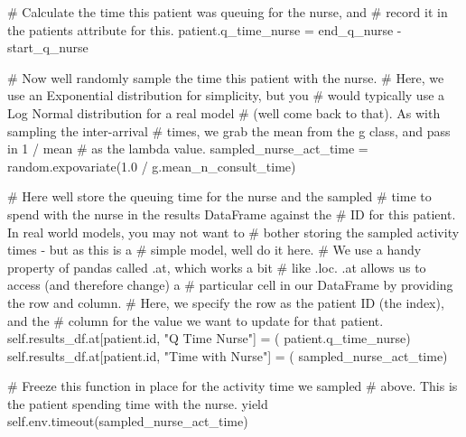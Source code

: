 \documentclass[
  letterpaper,
  DIV=11,
  numbers=noendperiod]{scrreprt}
\newenvironment{Shaded}{}{}
\newcommand{\BuiltInTok}[1]{\textcolor[rgb]{0.84,0.23,0.29}{#1}}
\newcommand{\CommentTok}[1]{\textcolor[rgb]{0.42,0.45,0.49}{#1}}
\newcommand{\ControlFlowTok}[1]{\textcolor[rgb]{0.84,0.23,0.29}{#1}}
\newcommand{\FloatTok}[1]{\textcolor[rgb]{0.00,0.36,0.77}{#1}}
\newcommand{\NormalTok}[1]{\textcolor[rgb]{0.14,0.16,0.18}{#1}}
\newcommand{\OperatorTok}[1]{\textcolor[rgb]{0.14,0.16,0.18}{#1}}
\newcommand{\StringTok}[1]{\textcolor[rgb]{0.01,0.18,0.38}{#1}}
\newcommand{\VariableTok}[1]{\textcolor[rgb]{0.89,0.38,0.04}{#1}}
\begin{document}
\begin{tcolorbox}
\begin{Shaded}
\begin{Highlighting}[]
            \CommentTok{\# Calculate the time this patient was queuing for the nurse, and}
            \CommentTok{\# record it in the patient\textquotesingle{}s attribute for this.}
\NormalTok{            patient.q\_time\_nurse }\OperatorTok{=}\NormalTok{ end\_q\_nurse }\OperatorTok{{-}}\NormalTok{ start\_q\_nurse}

            \CommentTok{\# Now we\textquotesingle{}ll randomly sample the time this patient with the nurse.}
            \CommentTok{\# Here, we use an Exponential distribution for simplicity, but you}
            \CommentTok{\# would typically use a Log Normal distribution for a real model}
            \CommentTok{\# (we\textquotesingle{}ll come back to that).  As with sampling the inter{-}arrival}
            \CommentTok{\# times, we grab the mean from the g class, and pass in 1 / mean}
            \CommentTok{\# as the lambda value.}
\NormalTok{            sampled\_nurse\_act\_time }\OperatorTok{=}\NormalTok{ random.expovariate(}\FloatTok{1.0} \OperatorTok{/}
\NormalTok{                                                        g.mean\_n\_consult\_time)}

            \CommentTok{\# Here we\textquotesingle{}ll store the queuing time for the nurse and the sampled}
            \CommentTok{\# time to spend with the nurse in the results DataFrame against the}
            \CommentTok{\# ID for this patient.  In real world models, you may not want to}
            \CommentTok{\# bother storing the sampled activity times {-} but as this is a}
            \CommentTok{\# simple model, we\textquotesingle{}ll do it here.}
            \CommentTok{\# We use a handy property of pandas called .at, which works a bit}
            \CommentTok{\# like .loc.  .at allows us to access (and therefore change) a}
            \CommentTok{\# particular cell in our DataFrame by providing the row and column.}
            \CommentTok{\# Here, we specify the row as the patient ID (the index), and the}
            \CommentTok{\# column for the value we want to update for that patient.}
            \VariableTok{self}\NormalTok{.results\_df.at[patient.}\BuiltInTok{id}\NormalTok{, }\StringTok{"Q Time Nurse"}\NormalTok{] }\OperatorTok{=}\NormalTok{ (}
\NormalTok{                patient.q\_time\_nurse)}
            \VariableTok{self}\NormalTok{.results\_df.at[patient.}\BuiltInTok{id}\NormalTok{, }\StringTok{"Time with Nurse"}\NormalTok{] }\OperatorTok{=}\NormalTok{ (}
\NormalTok{                sampled\_nurse\_act\_time)}

            \CommentTok{\# Freeze this function in place for the activity time we sampled}
            \CommentTok{\# above.  This is the patient spending time with the nurse.}
            \ControlFlowTok{yield} \VariableTok{self}\NormalTok{.env.timeout(sampled\_nurse\_act\_time)}


\end{Highlighting}
\end{Shaded}
\end{tcolorbox}
\end{document}
